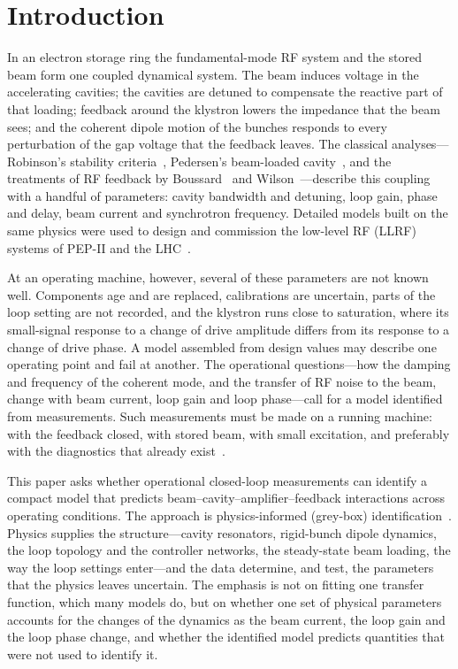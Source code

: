 \section{Introduction}\label{sec:intro}

In an electron storage ring the fundamental-mode RF system and the stored beam form one coupled dynamical system. The beam induces voltage in the accelerating cavities; the cavities are detuned to compensate the reactive part of that loading; feedback around the klystron lowers the impedance that the beam sees; and the coherent dipole motion of the bunches responds to every perturbation of the gap voltage that the feedback leaves. The classical analyses---Robinson's stability criteria~\cite{Robinson1964}, Pedersen's beam-loaded cavity~\cite{Pedersen1975}, and the treatments of RF feedback by Boussard~\cite{Boussard1985} and Wilson~\cite{Wilson1993}---describe this coupling with a handful of parameters: cavity bandwidth and detuning, loop gain, phase and delay, beam current and synchrotron frequency. Detailed models built on the same physics were used to design and commission the low-level RF (LLRF) systems of PEP-II and the LHC~\cite{Rivetta2007,Mastorides2010}.

At an operating machine, however, several of these parameters are not known well. Components age and are replaced, calibrations are uncertain, parts of the loop setting are not recorded, and the klystron runs close to saturation, where its small-signal response to a change of drive amplitude differs from its response to a change of drive phase. A model assembled from design values may describe one operating point and fail at another. The operational questions---how the damping and frequency of the coherent mode, and the transfer of RF noise to the beam, change with beam current, loop gain and loop phase---call for a model identified from measurements. Such measurements must be made on a running machine: with the feedback closed, with stored beam, with small excitation, and preferably with the diagnostics that already exist~\cite{Forssell1999,Ljung1999}.

This paper asks whether operational closed-loop measurements can identify a compact model that predicts beam--cavity--amplifier--feedback interactions across operating conditions. The approach is physics-informed (grey-box) identification~\cite{Bohlin2006,Pintelon2012}. Physics supplies the structure---cavity resonators, rigid-bunch dipole dynamics, the loop topology and the controller networks, the steady-state beam loading, the way the loop settings enter---and the data determine, and test, the parameters that the physics leaves uncertain. The emphasis is not on fitting one transfer function, which many models do, but on whether one set of physical parameters accounts for the changes of the dynamics as the beam current, the loop gain and the loop phase change, and whether the identified model predicts quantities that were not used to identify it.

